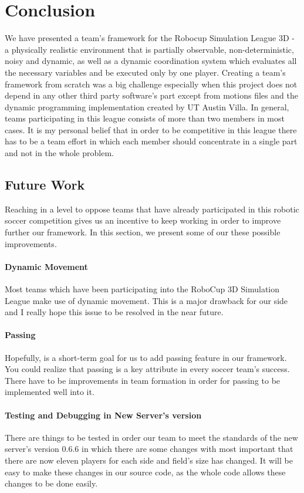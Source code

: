 \chapter{Conclusion}
\label{conclusion}

We have presented a team's framework for the Robocup Simulation League 3D - a physically realistic environment that is partially observable, non-deterministic, noisy and dynamic, as well as a dynamic coordination system which evaluates all the necessary variables and be executed only by one player. Creating a team's framework from scratch was a big challenge especially when this project does not depend in any other third party software's part except from motions files and the dynamic programming implementation created by UT Austin Villa. In general, teams participating in this league consists of more than two members in most cases. It is my personal belief that in order to be competitive in this league there has to be a team effort in which each member should concentrate in a single part and not in the whole problem.

\section{Future Work}
Reaching in a level to oppose teams that have already participated in this robotic soccer competition gives us an incentive to keep working in order to improve further our framework. In this section, we present some of our these possible improvements.  

\subsubsection*{Dynamic Movement}
Most teams which have been participating into the RoboCup 3D Simulation League make use of dynamic movement. This is a major drawback for our side and I really hope this issue to be resolved in the near future.
\subsubsection*{Passing}
Hopefully, is a short-term goal for us to add passing feature in our framework. You could realize that passing is a key attribute in every soccer team's success. There have to be improvements in team formation in order for passing to be implemented well into it.
\subsubsection*{Testing and Debugging in New Server's version}
There are things to be tested in order our team to meet the standards of the new server's version 0.6.6 in which there are some changes with most important that there are now eleven players for each side and field's size has changed. It will be easy to make these changes in our source code, as the whole code allows these changes to be done easily.

